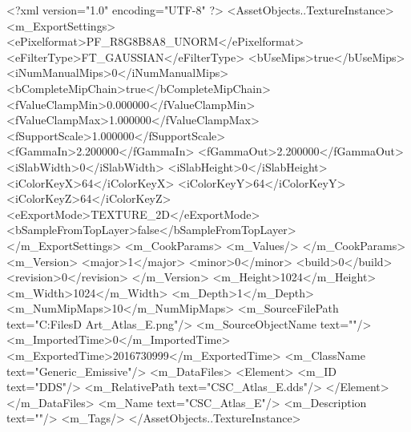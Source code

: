 <?xml version="1.0" encoding="UTF-8" ?>
<AssetObjects..TextureInstance>
	<m_ExportSettings>
		<ePixelformat>PF_R8G8B8A8_UNORM</ePixelformat>
		<eFilterType>FT_GAUSSIAN</eFilterType>
		<bUseMips>true</bUseMips>
		<iNumManualMips>0</iNumManualMips>
		<bCompleteMipChain>true</bCompleteMipChain>
		<fValueClampMin>0.000000</fValueClampMin>
		<fValueClampMax>1.000000</fValueClampMax>
		<fSupportScale>1.000000</fSupportScale>
		<fGammaIn>2.200000</fGammaIn>
		<fGammaOut>2.200000</fGammaOut>
		<iSlabWidth>0</iSlabWidth>
		<iSlabHeight>0</iSlabHeight>
		<iColorKeyX>64</iColorKeyX>
		<iColorKeyY>64</iColorKeyY>
		<iColorKeyZ>64</iColorKeyZ>
		<eExportMode>TEXTURE_2D</eExportMode>
		<bSampleFromTopLayer>false</bSampleFromTopLayer>
	</m_ExportSettings>
	<m_CookParams>
		<m_Values/>
	</m_CookParams>
	<m_Version>
		<major>1</major>
		<minor>0</minor>
		<build>0</build>
		<revision>0</revision>
	</m_Version>
	<m_Height>1024</m_Height>
	<m_Width>1024</m_Width>
	<m_Depth>1</m_Depth>
	<m_NumMipMaps>10</m_NumMipMaps>
	<m_SourceFilePath text="C:\Users\Shadow\Desktop\Working Files\3D Art\Textures\CSC_Atlas_E.png"/>
	<m_SourceObjectName text=""/>
	<m_ImportedTime>0</m_ImportedTime>
	<m_ExportedTime>2016730999</m_ExportedTime>
	<m_ClassName text="Generic_Emissive"/>
	<m_DataFiles>
		<Element>
			<m_ID text="DDS"/>
			<m_RelativePath text="CSC_Atlas_E.dds"/>
		</Element>
	</m_DataFiles>
	<m_Name text="CSC_Atlas_E"/>
	<m_Description text=""/>
	<m_Tags/>
</AssetObjects..TextureInstance>

